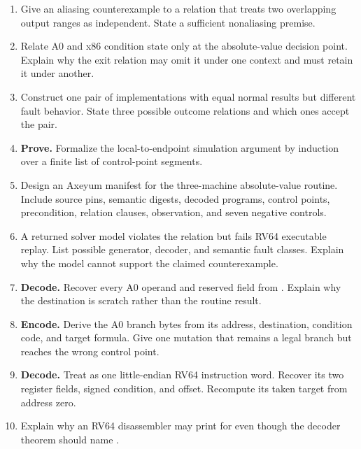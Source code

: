 \begin{enumerate}
\item Give an aliasing counterexample to a relation that treats two overlapping
output ranges as independent. State a sufficient nonaliasing premise.

\item Relate A0 and x86 condition state only at the absolute-value decision
point. Explain why the exit relation may omit it under one context and must
retain it under another.

\item Construct one pair of implementations with equal normal results but
different fault behavior. State three possible outcome relations and which
ones accept the pair.

\item \textbf{Prove.} Formalize the local-to-endpoint simulation argument by
induction over a finite list of control-point segments.

\item Design an Axeyum manifest for the three-machine absolute-value routine.
Include source pins, semantic digests, decoded programs, control points,
precondition, relation clauses, observation, and seven negative controls.

\item A returned solver model violates the relation but fails RV64 executable
replay. List possible generator, decoder, and semantic fault classes. Explain
why the model cannot support the claimed counterexample.

\item \textbf{Decode.} Recover every A0 operand and reserved field from
. Explain why the destination is scratch rather than the
routine result.

\item \textbf{Encode.} Derive the A0 branch bytes
 from its address, destination, condition code, and target
formula. Give one mutation that remains a legal branch but reaches the wrong
control point.

\item \textbf{Decode.} Treat  as one little-endian RV64
instruction word. Recover its two register fields, signed condition, and
offset. Recompute its taken target from address zero.

\item Explain why an RV64 disassembler may print  for
 even though the decoder theorem should name
.


\end{enumerate}
